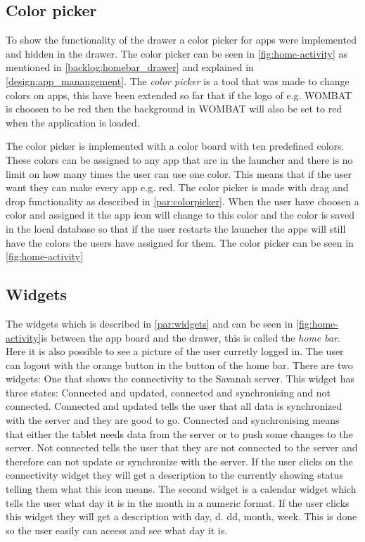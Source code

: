 \subsection{Color picker}
\label{home:colorpicker}
To show the functionality of the drawer a color picker for apps were implemented and hidden in the drawer. The color picker can be seen in \autoref{fig:home-activity} as mentioned in \autoref{backlog:homebar_drawer} and explained in \autoref{design:app_manangement}.
The \textit{color picker} is a tool that was made to change colors on apps, this have been extended so far that if the logo of e.g. WOMBAT is choosen to be red then the background in WOMBAT will also be set to red when the application is loaded.

The color picker is implemented with a color board with ten predefined \giraf[] colors. These colors can be assigned to any app that are in the launcher and there is no limit on how many times the user can use one color. This means that if the user want they can make every app e.g. red.
The color picker is made with drag and drop functionality as described in \autoref{par:colorpicker}. When the user have choosen a color and assigned it the app icon will change to this color and the color is saved in the local database so that if the user restarts the launcher the apps will still have the colors the users have assigned for them. 
The color picker can be seen in \autoref{fig:home-activity}

\subsection{Widgets}
The widgets which is described in \autoref{par:widgets} and can be seen in \autoref{fig:home-activity}is between the app board and the drawer, this is called the \textit{home bar}. Here it is also possible to see a picture of the user curretly logged in. The user can logout with the orange button in the button of the home bar. There are two widgets: One that shows the connectivity to the Savanah server. This widget has three states: Connected and updated, connected and synchronising and not connected. Connected and updated tells the user that all data is synchronized with the server and they are good to go. Connected and synchronising means that either the tablet needs data from the server or to push some changes to the server. Not connected tells the user that they are not connected to the server and therefore can not update or synchronize with the server.
If the user clicks on the connectivity widget they will get a description to the currently showing status telling them what this icon means.
The second widget is a calendar widget which tells the user what day it is in the month in a numeric format. If the user clicks this widget they will get a description with day, d. dd, month, week. This is done so the user easily can access and see what day it is.